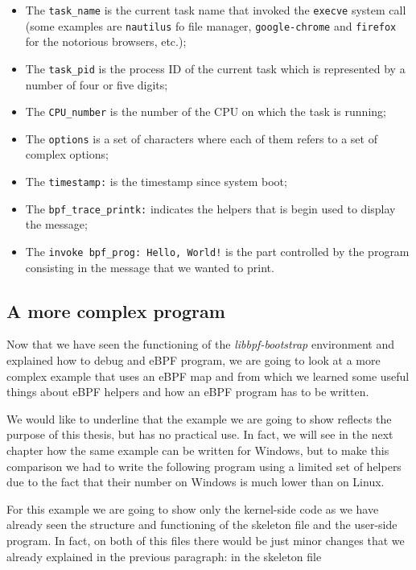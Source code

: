 \begin{itemize}
	\item The \verb|task_name| is the current task name that invoked the \verb|execve| 
		system call (some examples are \verb|nautilus| fo file manager, \verb|google-chrome| and \verb|firefox| for the notorious browsers, etc.);
	\item The \verb|task_pid| is the process ID of the current task which is 
		represented by a number of four or five digits;
	\item The \verb|CPU_number| is the number of the CPU on which the task is running;
	\item The \verb|options| is a set of characters where each of them refers to a set 
		of complex options;
	\item The \verb|timestamp:| is the timestamp since system boot;
	\item The \verb|bpf_trace_printk:| indicates the helpers that is begin used to
		display the message;
	\item The \verb|invoke bpf_prog: Hello, World!| is the part controlled by the
		program consisting in the message that we wanted to print.
\end{itemize}

\subsection{A more complex program}

Now that we have seen the functioning of the \textit{libbpf-bootstrap} environment and explained how to debug and eBPF program, we are going to look at a more complex example that uses an eBPF map and from which we learned some useful things about eBPF helpers and how an eBPF program has to be written.

We would like to underline that the example we are going to show reflects the purpose of this thesis, but has no practical use.
In fact, we will see in the next chapter how the same example can be written for Windows, but to make this comparison we had to write the following program using a limited set of helpers due to the fact that their number on Windows is much lower than on Linux.

For this example we are going to show only the kernel-side code as we have already seen the structure and functioning of the skeleton file and the user-side program.
In fact, on both of this files there would be just minor changes that we already explained in the previous paragraph: in the skeleton file 


